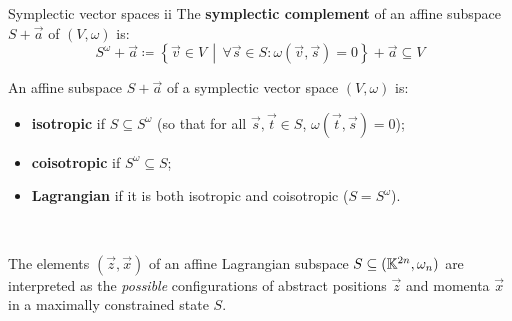 \documentclass{beamer}
\begin{document}
\begin{frame}{Symplectic vector spaces ii}
The  \textbf{symplectic complement} of an affine subspace \(S+\vec a\) of  \((V,\omega)\) is:
\[S^\omega+\vec a \coloneqq \left\{\vec v \in V \,\middle|\,  \forall \vec s \in S: \omega(\vec v,\vec s)
= 0\right\}+\vec a \subseteq V\]

An affine subspace \(S+\vec a\) of a symplectic vector space \((V,\omega)\) is:
\begin{itemize}
  \item  \textbf{isotropic} if \(S \subseteq S^\omega\) (so that for all \(\vec s, \vec t \in S\), \(\omega(\vec{t}, \vec{s})= 0\));
  \item  \textbf{coisotropic} if \(S^\omega \subseteq S\);
  \item  \textbf{Lagrangian} if it is both isotropic and coisotropic (\(S = S^\omega\)).
\end{itemize}

\

The elements \((\vec z, \vec x)\) of an affine Lagrangian subspace \(S \subseteq (\mathbb{K}^{2n},\omega_n)\) are interpreted as the \emph{possible} configurations of abstract positions \(\vec z\) and momenta \(\vec x\) in a maximally constrained state \(S\).
\end{frame}
\end{document}
